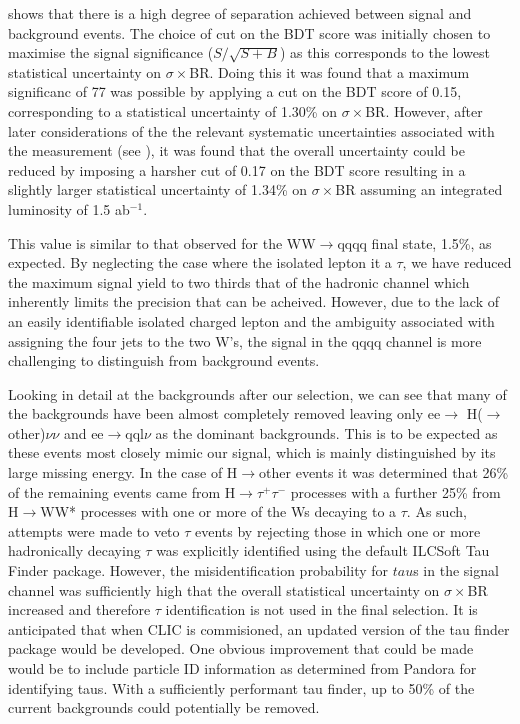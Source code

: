  shows that there is a high degree of separation achieved between signal and background events.
The choice of cut on the BDT score was initially chosen to maximise the signal significance ($S/\sqrt{S+B}$) as this corresponds to the lowest statistical uncertainty on $\sigma\times$BR. Doing this it was found that a maximum significanc of 77 was possible by applying a cut on the BDT score of 0.15, corresponding to a statistical uncertainty of 1.30\% on $\sigma\times$BR. However, after later considerations of the the relevant systematic uncertainties associated with the measurement (see ), it was found that the overall uncertainty could be reduced by imposing a harsher cut of 0.17 on the BDT score resulting in a slightly larger statistical uncertainty of 1.34\% on $\sigma\times$BR assuming an integrated luminosity of 1.5 ab$^{-1}$.

This value is similar to that observed for the WW$\rightarrow$qqqq final state, 1.5\%, as expected. By neglecting the case where the isolated lepton it a $\tau$, we have reduced the maximum signal yield to two thirds that of the hadronic channel which inherently limits the precision that can be acheived. However, due to the lack of an easily identifiable isolated charged lepton and the ambiguity associated with assigning the four jets to the two W's, the signal in the qqqq channel is more challenging to distinguish from background events.

Looking in detail at the backgrounds after our selection, we can see that many of the backgrounds have been almost completely removed leaving only ee$\rightarrow$ H($\rightarrow$ other)$\nu\nu$ and ee$\rightarrow$qql$\nu$ as the dominant backgrounds. This is to be expected as these events most closely mimic our signal, which is mainly distinguished by its large missing energy. In the case of H$\rightarrow$other events it was determined that 26\% of the remaining events came from H$\rightarrow\tau^+\tau^-$ processes with a further 25\% from H$\rightarrow$WW* processes with one or more of the Ws decaying to a $\tau$. As such, attempts were made to veto $\tau$ events by rejecting those in which one or more hadronically decaying $\tau$ was explicitly identified using the default ILCSoft Tau Finder \cite{TauFinder} package. However, the misidentification probability for $tau$s in the signal channel was sufficiently high that the overall statistical uncertainty on $\sigma \times$BR increased and therefore $\tau$ identification is not used in the final selection. It is anticipated that when \ac{CLIC} is commisioned, an updated version of the tau finder package would be developed. One obvious improvement that could be made would be to include particle ID information as determined from Pandora for identifying taus. With a sufficiently performant tau finder, up to 50\% of the current backgrounds could potentially be removed. 

